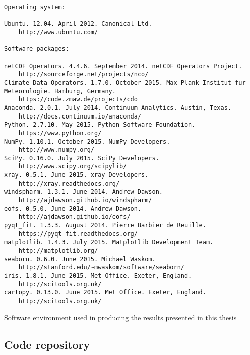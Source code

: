 \begin{featurebox}

\begin{tcolorbox}[width=\textwidth]

\begin{lstlisting}[basicstyle=\footnotesize\ttfamily, breaklines=true]
Operating system: 

Ubuntu. 12.04. April 2012. Canonical Ltd.
    http://www.ubuntu.com/

Software packages:

netCDF Operators. 4.4.6. September 2014. netCDF Operators Project.
    http://sourceforge.net/projects/nco/
Climate Data Operators. 1.7.0. October 2015. Max Plank Institut fur Meteorologie. Hamburg, Germany. 
    https://code.zmaw.de/projects/cdo
Anaconda. 2.0.1. July 2014. Continuum Analytics. Austin, Texas.
    http://docs.continuum.io/anaconda/
Python. 2.7.10. May 2015. Python Software Foundation.
    https://www.python.org/
NumPy. 1.10.1. October 2015. NumPy Developers. 
    http://www.numpy.org/
SciPy. 0.16.0. July 2015. SciPy Developers.
    http://www.scipy.org/scipylib/
xray. 0.5.1. June 2015. xray Developers.
    http://xray.readthedocs.org/
windspharm. 1.3.1. June 2014. Andrew Dawson.
    http://ajdawson.github.io/windspharm/
eofs. 0.5.0. June 2014. Andrew Dawson.
    http://ajdawson.github.io/eofs/
pyqt_fit. 1.3.3. August 2014. Pierre Barbier de Reuille. 
    https://pyqt-fit.readthedocs.org/
matplotlib. 1.4.3. July 2015. Matplotlib Development Team.
    http://matplotlib.org/
seaborn. 0.6.0. June 2015. Michael Waskom.
    http://stanford.edu/~mwaskom/software/seaborn/
iris. 1.8.1. June 2015. Met Office. Exeter, England.
    http://scitools.org.uk/
cartopy. 0.13.0. June 2015. Met Office. Exeter, England.
    http://scitools.org.uk/
\end{lstlisting}

\end{tcolorbox}

\caption{\label{box:software_description}
Software environment used in producing the results presented in this thesis \citep[and documented at][]{IrvingFigshare2016}}

\end{featurebox}  

\subsection{Code repository}

